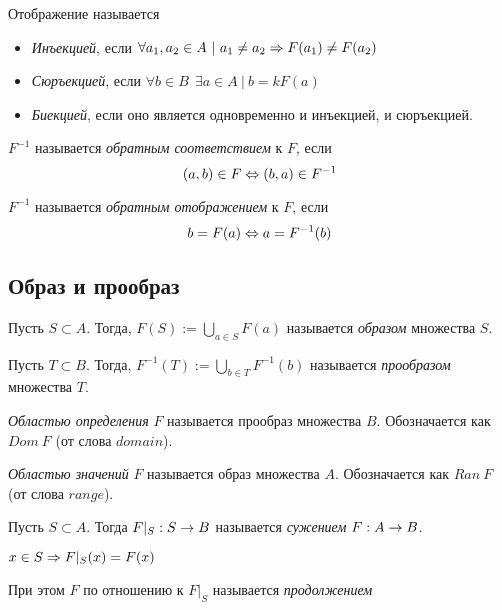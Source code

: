 Отображение называется
\begin{itemize}
	\item \textit{Инъекцией}, если $\forall a_1, a_2 \in A\ |\ a_1 \neq a_2 \Rightarrow F(a_1) \neq F(a_2)$
	\item \textit{Сюръекцией}, если $\forall b \in B\ \ \exists a \in A\ |\ b =k F(a)$
	\item \textit{Биекцией}, если оно является одновременно и инъекцией, и сюръекцией.
\end{itemize}

\begin{definition}
	$F^{-1}$ называется \textit{обратным соответствием} к $F$, если
	$$
		(a, b) \in F \Leftrightarrow (b, a) \in F^{-1}
	$$
\end{definition}

\begin{definition}
		$F^{-1}$ называется \textit{обратным отображением} к $F$, если
	$$
		b = F(a) \Leftrightarrow a = F^{-1}(b)
	$$
\end{definition}

\subsection{Образ и прообраз}

\begin{definition}
	Пусть $S \subset A$. Тогда, $F(S) := \bigcup\limits_{a \in S} F(a)$ называется \textit{образом} множества $S$.
\end{definition}

\begin{definition}
	Пусть $T \subset B$. Тогда, $F^{-1}(T) := \bigcup\limits_{b \in T} F^{-1}(b)$ называется \textit{прообразом} множества $T$.
\end{definition}

\begin{definition}
	\textit{Областью определения} $F$ называется прообраз множества $B$. Обозначается как $Dom\ F$ (от слова $domain$).
\end{definition}

\begin{definition}
	\textit{Областью значений} $F$ называется образ множества $A$. Обозначается как $Ran\ F$ (от слова $range$).
\end{definition}

\begin{definition}
	Пусть $S \subset A$. Тогда $F|_S : S \rightarrow B$ называется \textit{сужением} $F : A \rightarrow B$.
	
	$x \in S \Rightarrow F|_S(x) = F(x)$
	
	При этом $F$ по отношению к $F|_S$ называется \textit{продолжением}
\end{definition}


